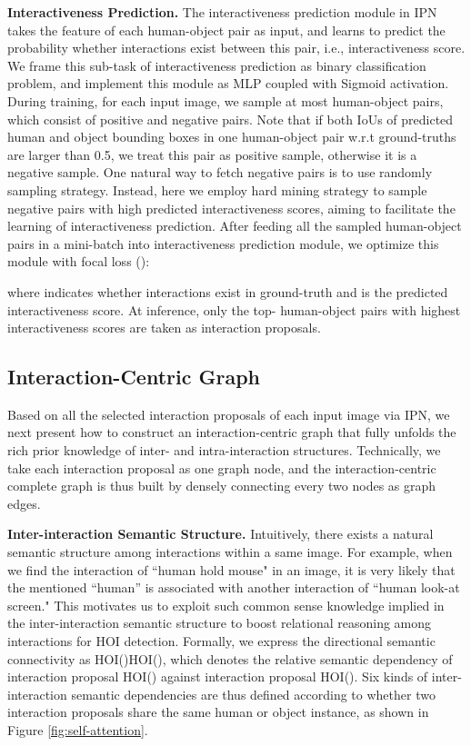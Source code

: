 \documentclass[10pt,twocolumn,letterpaper]{article}
\begin{document}
\textbf{Interactiveness Prediction.}
The interactiveness prediction module in IPN takes the feature of each human-object pair as input, and learns to predict the probability whether interactions exist between this pair, i.e., interactiveness score. We frame this sub-task of interactiveness prediction as binary classification problem, and implement this module as MLP coupled with Sigmoid activation. During training, for each input image, we sample at most  human-object pairs, which consist of positive and negative pairs. Note that if both IoUs of predicted human and object bounding boxes in one human-object pair w.r.t ground-truths are larger than 0.5, we treat this pair as positive sample, otherwise it is a negative sample.
One natural way to fetch negative pairs is to use randomly sampling strategy. Instead, here we employ hard mining strategy \cite{shrivastava2016training} to sample negative pairs with high predicted interactiveness scores, aiming to facilitate the learning of interactiveness prediction. After feeding all the  sampled human-object pairs in a mini-batch into interactiveness prediction module, we optimize this module with focal loss \cite{lin2017focal} ():

\vspace{-0.1in}

where  indicates whether interactions exist in ground-truth and  is the predicted interactiveness score.
At inference, only the top- human-object pairs with highest interactiveness scores are taken as interaction proposals.



\subsection{Interaction-Centric Graph}
Based on all the selected interaction proposals of each input image via IPN, we next present how to construct an interaction-centric graph that fully unfolds the rich prior knowledge of inter- and intra-interaction structures. Technically, we take each interaction proposal as one graph node, and the interaction-centric complete graph is thus built by densely connecting every two nodes as graph edges.

\textbf{Inter-interaction Semantic Structure.}
Intuitively, there exists a natural semantic structure among interactions within a same image. For example, when we find the interaction of ``human hold mouse" in an image, it is very likely that the mentioned ``human'' is associated with another interaction of ``human look-at screen." This motivates us to exploit such common sense knowledge implied in the inter-interaction semantic structure to boost relational reasoning among interactions for HOI detection. Formally, we express the directional semantic connectivity as HOI()HOI(), which denotes the relative semantic dependency of interaction proposal HOI() against interaction proposal HOI(). Six kinds of inter-interaction semantic dependencies are thus defined according to whether two interaction proposals share the same human or object instance, as shown in Figure \ref{fig:self-attention}.
\end{document}
